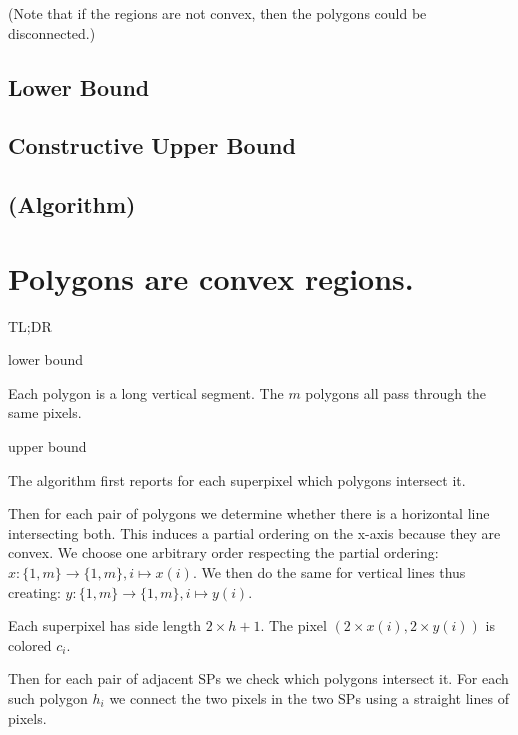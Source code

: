 \documentclass[a4paper, UKenglish]{lipics-v2018}
\begin{document}
(Note that if the regions are not convex, then the polygons could be disconnected.)


\subsection{Lower Bound}
\label{sub:fat_lower}




\subsection{Constructive Upper Bound}
\label{sub:fat_upper}




\subsection{(Algorithm)}
\label{sub:fat_algo}






\section{Polygons are convex regions.}
\label{sec:convex}

TL;DR

lower bound

Each polygon is a long vertical segment. The $m$ polygons all pass through the same pixels.

upper bound

The algorithm first reports for each superpixel which  polygons intersect it.

Then for each pair of polygons we determine whether there is a horizontal line intersecting both. This induces a partial ordering on the x-axis because they are convex.
We choose one arbitrary order respecting the partial ordering: $x: \{1, m\}\to \{1, m\}, i\mapsto x(i)$.
We then do the same for vertical lines thus creating: $y: \{1, m\}\to \{1, m\}, i\mapsto y(i)$.

Each superpixel has side length $2\times h+1$. The pixel $(2\times x(i), 2\times y(i))$ is colored $c_i$.

Then for each pair of adjacent SPs we check which polygons intersect it. For each such polygon $h_i$ we connect the two pixels in the two SPs using a straight lines of pixels.
\end{document}
